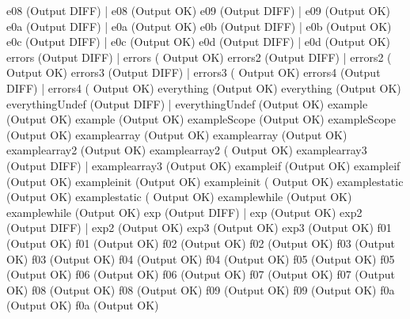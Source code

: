 \documentclass[12pt]{book}
\begin{document}
e08 (Output DIFF)                                      |    e08 (Output OK)
e09 (Output DIFF)                                      |    e09 (Output OK)
e0a (Output DIFF)                                      |    e0a (Output OK)
e0b (Output DIFF)                                      |    e0b (Output OK)
e0c (Output DIFF)                                      |    e0c (Output OK)
e0d (Output DIFF)                                      |    e0d (Output OK)
errors (Output DIFF)                                      |    errors (
Output OK)
errors2 (Output DIFF)                                      |    errors2 (
Output OK)
errors3 (Output DIFF)                                      |    errors3 (
Output OK)
errors4 (Output DIFF)                                      |    errors4 (
Output OK)
everything (Output OK)                                    everything (Output
OK)
everythingUndef (Output DIFF)                                  |    
everythingUndef (Output OK)
example (Output OK)                                    example (Output OK)
exampleScope (Output OK)                                exampleScope (Output
OK)
examplearray (Output OK)                                examplearray (Output
OK)
examplearray2 (Output OK)                                examplearray2 (
Output OK)
examplearray3 (Output DIFF)                                  |    
examplearray3 (Output OK)
exampleif (Output OK)                                    exampleif (Output 
OK)
exampleinit (Output OK)                                    exampleinit (
Output OK)
examplestatic (Output OK)                                examplestatic (
Output OK)
examplewhile (Output OK)                                examplewhile (Output
OK)
exp (Output DIFF)                                      |    exp (Output OK)
exp2 (Output DIFF)                                      |    exp2 (Output OK)
exp3 (Output OK)                                    exp3 (Output OK)
f01 (Output OK)                                        f01 (Output OK)
f02 (Output OK)                                        f02 (Output OK)
f03 (Output OK)                                        f03 (Output OK)
f04 (Output OK)                                        f04 (Output OK)
f05 (Output OK)                                        f05 (Output OK)
f06 (Output OK)                                        f06 (Output OK)
f07 (Output OK)                                        f07 (Output OK)
f08 (Output OK)                                        f08 (Output OK)
f09 (Output OK)                                        f09 (Output OK)
f0a (Output OK)                                        f0a (Output OK)
\end{document}

